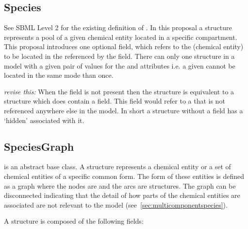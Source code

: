 \documentclass{cekarticle}
\begin{document}
\subsection{Species}
\label{sec:species}

See SBML Level 2 for the existing definition of .  In this proposal a 
 structure represents a pool of a given chemical entity located in a specific
compartment. 
This proposal introduces one optional  field,  which refers to
the  (chemical entity) to be located in the  referenced by
the  field.  There can only one  structure in a model with a given
pair of values for the  and  attributes i.e.
a given  cannot be located in the same  mode than once.

\emph{revise this:}
When the  field is not present then the  structure is equivalent
to a  structure which does contain a  field.
This field would refer to a  that is not referenced anywhere else in the model.
In short a  structure without a  field has a
`hidden'  associated with it.

\subsection{SpeciesGraph}

 is an abstract base class.
A  structure represents a chemical entity or a set of chemical entities of
a specific common form.  The form of these entities is defined as a graph where the nodes are
 and the arcs are  structures.  The graph can be disconnected
indicating that the detail of how parts of the chemical entities are associated are not relevant to the
model (see~\ref{sec:multicomponentspecies}).  

A  structure is composed of the following fields:
\end{document}
